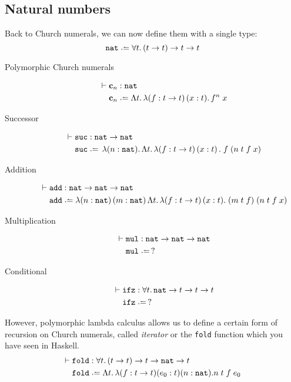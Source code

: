 \subsection{Natural numbers}
Back to Church numerals, we can now define them with a single type:
\[
  \nat \defeq \forall t.\, (t\to t)\to t\to t
\]
  \begin{description}
    \item[Polymorphic Church numerals]
      \begin{align*}
        \vdash{} & \bc_n : \nat \\
        & \bc_n \defeq \Lambda t.\,\lambda (f:t \to t)\,(x:t).\,
        f^n\;x
      \end{align*}
    \item[Successor]
      \begin{align*}
        \vdash{} & \suc : \nat \to \nat \\
        & \suc \defeq \,\lambda (n : \nat).\,\Lambda t.\,\lambda
        (f : t \to t)\,(x:t)\,.\;f\;(n\;t\;f\;x) 
      \end{align*}
    \item[Addition]
      \begin{align*}
        \vdash{} & \add : \nat \to \nat \to \nat \\
        & \add \defeq \lambda (n : \nat)\,(m:\nat)\,\Lambda t.\,
        \lambda (f:t\to t)\,(x: t).\; (m\;t\;f)\;(n\;t\;f\;x) 
      \end{align*}
    \item[Multiplication] 
      \begin{align*}
      \vdash{} & \mul : \nat\to \nat \to\nat\\
        & \mul \defeq\,?
      \end{align*}
    \item[Conditional]
      \begin{align*}
        \vdash {} & \ifz : \forall t.\,\nat \to t \to t \to t \\
        & \ifz \defeq\,?
      \end{align*}
  \end{description}
However, polymorphic lambda calculus allows us to define a certain form of
recursion on Church numerals, called \emph{iterator} or the
\texttt{fold} function which you have seen in Haskell.
\begin{align*}
  \vdash{} & \mathtt{fold} : \forall t.\, (t \to t) \to t \to \nat \to t  \\
  & \mathtt{fold} \defeq \Lambda t.\, \lambda (f : t \to t)(e_0 : t)(n : \nat). 
  n\;t\;f\;e_0
\end{align*}

